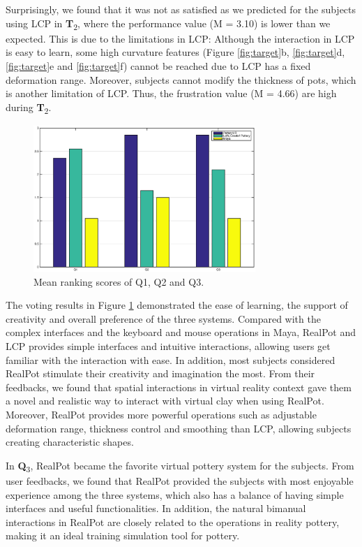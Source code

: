 \documentclass{svjour3}                     %
\begin{document}
Surprisingly, we found that it was not as satisfied as we predicted for the subjects using LCP in \textbf{T}\textsubscript{2}, where the performance value (M = 3.10) is lower than we expected. This is due to the limitations in LCP: Although the interaction in LCP is easy to learn, some high curvature features (Figure \ref{fig:target}b, \ref{fig:target}d, \ref{fig:target}e and \ref{fig:target}f) cannot be reached due to LCP has a fixed deformation range. Moreover, subjects cannot modify the thickness of pots, which is another limitation of LCP. Thus, the frustration value (M = 4.66) are high during \textbf{T}\textsubscript{2}.

\begin{figure}
	\includegraphics[width=0.75\textwidth]{fig15.eps}
	\caption{Mean ranking scores of Q1, Q2 and Q3.}
	\label{fig:ranking}
\end{figure}

The voting results in Figure \ref{fig:ranking} demonstrated the ease of learning, the support of creativity and overall preference of the three systems.
Compared with the complex interfaces and the keyboard and mouse operations in Maya, RealPot and LCP provides simple interfaces and intuitive interactions, allowing users get familiar with the interaction with ease.
In addition, most subjects considered RealPot stimulate their creativity and imagination the most. From their feedbacks, we found that spatial interactions in virtual reality context gave them a novel and realistic way to interact with virtual clay when using RealPot. Moreover, RealPot provides more powerful operations such as adjustable deformation range, thickness control and smoothing than LCP, allowing subjects creating characteristic shapes.

In \textbf{Q}\textsubscript{3}, RealPot became the favorite virtual pottery system for the subjects. From user feedbacks, we found that RealPot provided the subjects with most enjoyable experience among the three systems, which also has a balance of having simple interfaces and useful functionalities. In addition, the natural bimanual interactions in RealPot are closely related to the operations in reality pottery, making it an ideal training simulation tool for pottery.
\end{document}
